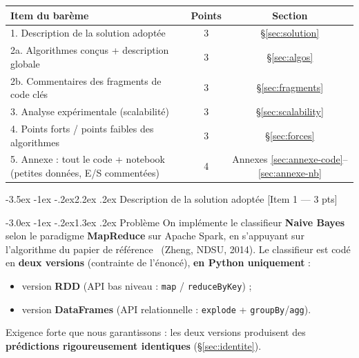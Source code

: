 \documentclass[11pt,a4paper]{article}
\makeatletter
\newcommand{\code}[1]{\lstinline[style=py]!#1!}
\renewcommand\section{\@startsection{section}{1}{\z@}%
  {-3.5ex \@plus -1ex \@minus -.2ex}{2.2ex \@plus.2ex}%
  {\normalfont\Large\bfseries\color{primary}}}
\renewcommand\subsection{\@startsection{subsection}{2}{\z@}%
  {-3.0ex \@plus -1ex \@minus -.2ex}{1.3ex \@plus.2ex}%
  {\normalfont\large\bfseries\color{primary!88!black}}}
\makeatother
\begin{document}
\begin{table}[H]
\centering
\small
\renewcommand{\arraystretch}{1.25}
\begin{tabular}{@{}p{8.6cm}cc@{}}
\toprule
\textbf{Item du barème} & \textbf{Points} & \textbf{Section} \\
\midrule
1. Description de la solution adoptée & 3 & \S\ref{sec:solution} \\
2a. Algorithmes conçus + description globale & 3 & \S\ref{sec:algos} \\
2b. Commentaires des fragments de code clés & 3 & \S\ref{sec:fragments} \\
3. Analyse expérimentale (scalabilité) & 3 & \S\ref{sec:scalability} \\
4. Points forts / points faibles des algorithmes & 3 & \S\ref{sec:forces} \\
5. Annexe : tout le code + notebook (petites données, E/S commentées) & 4 & Annexes \ref{sec:annexe-code}--\ref{sec:annexe-nb} \\
\bottomrule
\end{tabular}
\end{table}
\vspace{0.4em}

\section{Description de la solution adoptée \hfill\normalsize\textmd{[Item 1 --- 3 pts]}}
\label{sec:solution}

\subsection{Problème}
On implémente le classifieur \textbf{Naive Bayes} selon le paradigme \textbf{MapReduce}
sur Apache Spark, en s'appuyant sur l'algorithme du papier de référence~\cite{nbmapreduce}
(Zheng, NDSU, 2014). Le classifieur est codé en \textbf{deux versions} (contrainte de
l'énoncé), \textbf{en Python uniquement} :
\begin{itemize}
  \item version \textbf{RDD} (API bas niveau : \code{map} / \code{reduceByKey}) ;
  \item version \textbf{DataFrames} (API relationnelle : \code{explode} + \code{groupBy}/\code{agg}).
\end{itemize}
Exigence forte que nous garantissons : les deux versions produisent des \textbf{prédictions
rigoureusement identiques} (\S\ref{sec:identite}).
\end{document}
